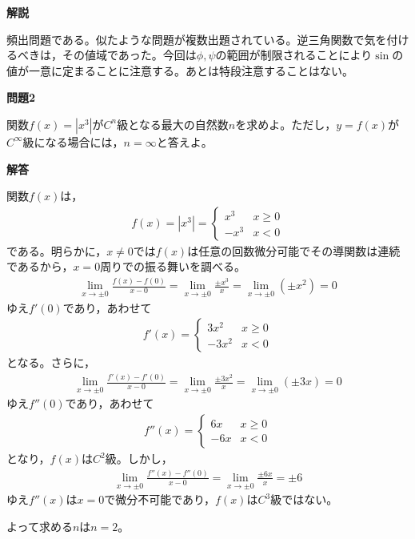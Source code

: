\documentclass[a4paper,12pt,dvipdfmx,fleqn, oneside]{jsarticle}
\theoremstyle{defstyle}
\theoremstyle{thmx}
\theoremstyle{qesstyle}
\begin{document}
\textbf{解説}

頻出問題である。似たような問題が複数出題されている。逆三角関数で気を付けるべきは，その値域であった。今回は$\phi , \psi$の範囲が制限されることにより$\sin$の値が一意に定まることに注意する。あとは特段注意することはない。

\begin{shadebox}
    \textbf{問題2}

    関数$f(x)=\left|x^3\right|$が$C^n$級となる最大の自然数$n$を求めよ。ただし，$y=f(x)$が$C^{\infty}$級になる場合には，$n=\infty$と答えよ。
\end{shadebox}

\begin{screen}
    \textbf{解答}

    \text{　}関数$f(x)$は，
    \begin{align*}
        f(x)= |x^3| = \begin{cases}
            x^3  & x \geq 0 \\
            -x^3 & x < 0
        \end{cases}
    \end{align*}
    である。明らかに，$x \neq 0$では$f(x)$は任意の回数微分可能でその導関数は連続であるから，$x= 0$周りでの振る舞いを調べる。
    \begin{align*}
        \lim_{x \to \pm 0} \frac{f(x)-f(0)}{x-0} = \lim_{x \to \pm 0} \frac{\pm x^3}{x} = \lim_{x \to \pm 0} (\pm x^2) =0
    \end{align*}
    ゆえ$f'(0)$であり，あわせて
    \begin{align*}
        f'(x) = \begin{cases}
            3x^2   & x  \geq 0 \\
            - 3x^2 & x <0
        \end{cases}
    \end{align*}
    となる。さらに，
    \begin{align*}
        \lim_{x \to \pm 0} \frac{f'(x)-f'(0)}{x-0} = \lim_{x \to \pm 0} \frac{\pm 3x^2}{x} = \lim_{x \to \pm 0} (\pm 3x) =0
    \end{align*}
    ゆえ$f''(0)$であり，あわせて
    \begin{align*}
        f''(x) = \begin{cases}
            6x  & x \geq 0 \\
            -6x & x <0
        \end{cases}
    \end{align*}
    となり，$f(x)$は$C^2$級。しかし，
    \begin{align*}
        \lim_{x \to \pm 0} \frac{f''(x)-f''(0)}{x-0} = \lim_{x \to \pm 0} \frac{\pm 6x}{x} = \pm 6
    \end{align*}
    ゆえ$f''(x)$は$x=0$で微分不可能であり，$f(x)$は$C^3$級ではない。

    \text{　}よって求める$n$は$n=2$。
\end{screen}
\end{document}
